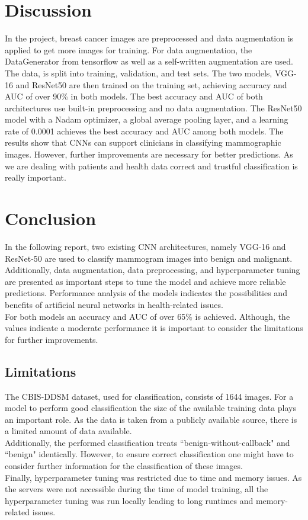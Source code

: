 \documentclass[sn-mathphys,Numbered]{sn-jnl}%
\theoremstyle{thmstyleone}%
\theoremstyle{thmstyletwo}%
\theoremstyle{thmstylethree}%
\begin{document}
\section{Discussion}
\label{Discussion}
In the project, breast cancer images are preprocessed and data augmentation is applied to get more images for training. For data augmentation, the DataGenerator from tensorflow as well as a self-written augmentation are used.\\
The data, is split into training, validation, and test sets. The two models, VGG-16 and ResNet50 are then trained on the training set, achieving accuracy and AUC of over 90\% in both models. The best accuracy and AUC of both architectures use built-in preprocessing  and no data augmentation. The ResNet50 model with a Nadam optimizer, a global average pooling layer, and a learning rate of 0.0001 achieves the best accuracy and AUC among both models.
The results show that CNNs can support clinicians in classifying mammographic images. However, further improvements are necessary for better predictions. As we are dealing with patients and health data correct and trustful classification is really important.
\section{Conclusion}
\label{conclusion}
In the following report, two existing CNN architectures, namely VGG-16 and ResNet-50 are used to classify mammogram images into benign and malignant.\\
Additionally, data augmentation, data preprocessing, and hyperparameter tuning are presented as important steps to tune the model and achieve more reliable predictions.
Performance analysis of the models indicates the possibilities and benefits of artificial neural networks in health-related issues. \\
For both models an accuracy and AUC of over 65\% is achieved.
Although, the values indicate a moderate performance it is important to consider the limitations for further improvements.
\subsection{Limitations}
\label{limitation}
The CBIS-DDSM dataset, used for classification, consists of 1644 images. For a model to perform good classification the size of the available training data plays an important role. As the data is taken from a publicly available source, there is a limited amount of data available. \\
Additionally, the performed classification treats ``benign-without-callback"  and ``benign" identically. However, to ensure correct classification one might have to consider further information for the classification of these images.\\
Finally, hyperparameter tuning was restricted due to time and memory issues. As the servers were not accessible during the time of model training, all the hyperparameter tuning was run locally leading to long runtimes and memory-related issues.

\end{document}
